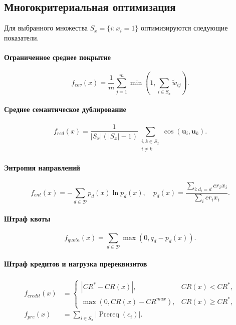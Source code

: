 \documentclass[twoside,11pt]{article}
\newcommand{\Dcal}{\mathcal{D}}
\begin{document}
\subsection{Многокритериальная оптимизация}

Для выбранного множества $S_x=\{i:x_i=1\}$ оптимизируются следующие показатели.

\paragraph{Ограниченное среднее покрытие}
\begin{equation}
  f_{cov}(x)=\frac{1}{m}
  \sum_{j=1}^{m}
  \min\left(1,\sum_{i\in S_x}\tilde w_{ij}\right).
  \label{eq:objective-coverage}
\end{equation}

\paragraph{Среднее семантическое дублирование}
\begin{equation}
  f_{red}(x)=
  \frac{1}{|S_x|(|S_x|-1)}
  \sum_{\substack{i,k\in S_x\\i\ne k}}
  \cos(\mathbf{u}_i,\mathbf{u}_k).
  \label{eq:redundancy}
\end{equation}

\paragraph{Энтропия направлений}
\begin{equation}
  f_{ent}(x)=
  -\sum_{d\in\Dcal}p_d(x)\ln p_d(x),
  \quad
  p_d(x)=
  \frac{\sum_{i:d_i=d}cr_i x_i}
       {\sum_i cr_i x_i}.
  \label{eq:entropy}
\end{equation}

\paragraph{Штраф квоты}
\begin{equation}
  f_{quota}(x)=
  \sum_{d\in\Dcal}\max(0,q_d-p_d(x)).
  \label{eq:quota-penalty}
\end{equation}

\paragraph{Штраф кредитов и нагрузка пререквизитов}
\begin{align}
  f_{credit}(x)&=
  \begin{cases}
  |CR^\ast-CR(x)|, & CR(x)<CR^\ast,\\
  \max(0,CR(x)-CR^{max}), & CR(x)\ge CR^\ast,
  \end{cases}\\
  f_{pre}(x)&=\sum_{i\in S_x}|\operatorname{Prereq}(c_i)|.
  \label{eq:other-penalties}
\end{align}
\end{document}
